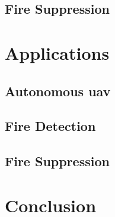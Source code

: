 \documentclass[runningheads]{llncs}
\begin{document}
\subsection{Fire Suppression}

\section{Applications}

\subsection{Autonomous \acrshort{uav}}

\subsection{Fire Detection}

\subsection{Fire Suppression}

\section{Conclusion}


\end{document}

